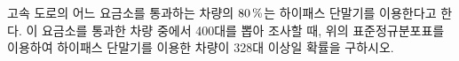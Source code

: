 \noindent\begin{minipage}[t]{0.58\linewidth}\vspace{0pt}\raggedright 고속 도로의 어느 요금소를 통과하는 차량의 $80\mkern3mu \%$는 하이패스 단말기를 이용한다고 한다. 이 요금소를 통과한 차량 중에서 400대를 뽑아 조사할 때, 위의 표준정규분포표를 이용하여 하이패스 단말기를 이용한 차량이 328대 이상일 확률을 구하시오.\end{minipage}\hfill\begin{minipage}[t]{0.4\linewidth}\vspace{0pt}\centering \resizebox{\ifdim\width>\linewidth\linewidth\else\width\fi}{!}{}\end{minipage}\par
